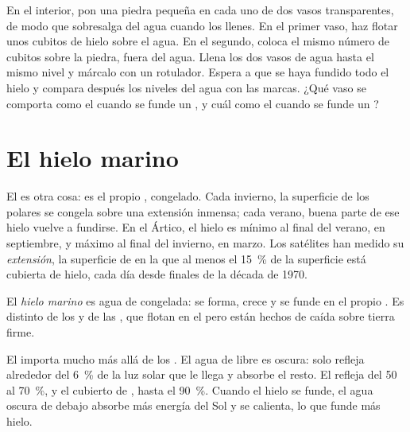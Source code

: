 \begin{inthelab}
En el interior, pon una piedra pequeña en cada uno de dos vasos
transparentes, de modo que sobresalga del agua cuando los llenes. En el
primer vaso, haz flotar unos cubitos de hielo sobre el agua. En el
segundo, coloca el mismo número de cubitos sobre la piedra, fuera del
agua. Llena los dos vasos de agua hasta el mismo nivel y márcalo con un
rotulador. Espera a que se haya fundido todo el hielo y compara después
los niveles del agua con las marcas. ¿Qué vaso se comporta como el 
cuando se funde un , y cuál como el  cuando se funde un
?
\end{inthelab}

\section{El hielo marino}

El  es otra cosa: es el propio , congelado. Cada invierno,
la superficie de los  polares se congela sobre una extensión
inmensa; cada verano, buena parte de ese hielo vuelve a fundirse. En el
Ártico, el hielo es mínimo al final del verano, en septiembre, y máximo al
final del invierno, en marzo. Los satélites han medido su
\emph{extensión}, la superficie de  en la que al menos el 15~\% de la
superficie está cubierta de hielo, cada día desde finales de la década de
1970.

\begin{definition}\label{def:g8:ice-on-earth:sea-ice}
El \emph{hielo marino} es agua de  congelada: se
forma, crece y se funde en el propio . Es distinto de los  y
de las , que flotan en el  pero están hechos de
 caída sobre tierra firme.
\end{definition}

El  importa mucho más allá de los . El agua de  libre
es oscura: solo refleja alrededor del 6~\% de la luz solar que le llega y
absorbe el resto. El  refleja del 50 al 70~\%, y el  cubierto de , hasta el 90~\%. Cuando el hielo se funde, el agua
oscura de debajo absorbe más energía del Sol y se calienta, lo que funde
más hielo.

